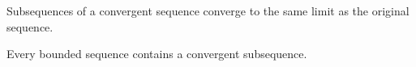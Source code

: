 \begin{tcolorbox}
\begin{thm}
Subsequences of a convergent sequence converge to the same limit as the original sequence.
\end{thm}
\end{tcolorbox}


\begin{tcolorbox}
    \begin{thm}
        Every bounded sequence contains a convergent subsequence.
\end{thm}
\end{tcolorbox}


